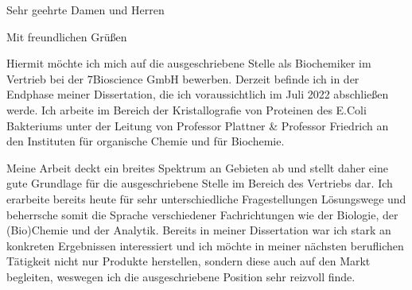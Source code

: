 

\date{\today}
\opening{Sehr geehrte Damen und Herren}
\closing{Mit freundlichen Grüßen}
{}
\makelettertitle
\justifying

Hiermit möchte ich mich auf die ausgeschriebene Stelle als Biochemiker im Vertrieb bei der 7Bioscience GmbH bewerben. Derzeit befinde ich in der Endphase meiner Dissertation, die ich voraussichtlich im Juli 2022 abschließen werde. Ich arbeite im Bereich der Kristallografie von Proteinen des E.Coli Bakteriums unter der Leitung von Professor Plattner \& Professor Friedrich an den Instituten für organische Chemie und für Biochemie. \par
Meine Arbeit deckt ein breites Spektrum an Gebieten ab und stellt daher eine gute Grundlage für die ausgeschriebene Stelle im Bereich des Vertriebs dar. Ich erarbeite bereits heute für sehr unterschiedliche Fragestellungen Lösungswege und beherrsche somit die Sprache verschiedener Fachrichtungen wie der Biologie, der (Bio)Chemie und der Analytik. Bereits in meiner Dissertation war ich stark an konkreten Ergebnissen interessiert und ich möchte in meiner nächsten beruflichen Tätigkeit nicht nur Produkte herstellen, sondern diese auch auf den Markt begleiten, weswegen ich die ausgeschriebene Position sehr reizvoll finde.\par


